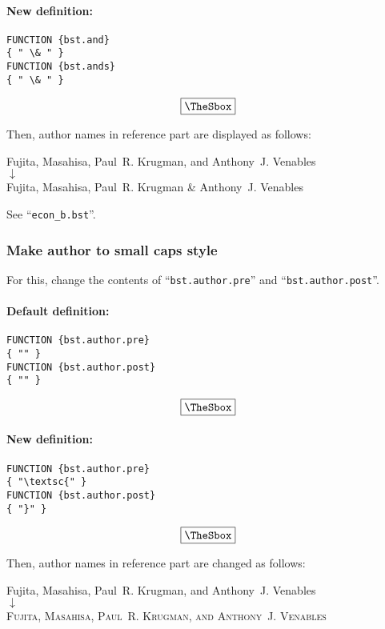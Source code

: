 \documentclass[10pt]{article}
\newenvironment{Frame}%
{\setlength{\fboxsep}{15pt}
\setlength{\mylength}{\linewidth}%
\addtolength{\mylength}{-2\fboxsep}%
\addtolength{\mylength}{-2\fboxrule}%
\Sbox
\minipage{\mylength}%
\setlength{\abovedisplayskip}{0pt}%
\setlength{\belowdisplayskip}{0pt}%
}%
{\endminipage\endSbox
\[\fbox{\TheSbox}\]}
\begin{document}
\paragraph{New definition:}
\begin{Frame}
\begin{verbatim}
FUNCTION {bst.and}
{ " \& " }
FUNCTION {bst.ands}
{ " \& " }
\end{verbatim}
\end{Frame}

Then, author names in reference part are displayed as follows:
\begin{center}
Fujita, Masahisa, Paul~R. Krugman, and Anthony~J. Venables \\
 $\downarrow$ \\
Fujita, Masahisa, Paul~R. Krugman \& Anthony~J. Venables 
\end{center}

See ``\verb|econ_b.bst|''.

\subsubsection{Make author to small caps style}

For this, change the contents of ``\texttt{bst.author.pre}'' and ``\texttt{bst.author.post}''.
\paragraph{Default definition:}
\begin{Frame}
\begin{verbatim}
FUNCTION {bst.author.pre}
{ "" }
FUNCTION {bst.author.post}
{ "" }
\end{verbatim}
\end{Frame}

\paragraph{New definition:}
\begin{Frame}
\begin{verbatim}
FUNCTION {bst.author.pre}
{ "\textsc{" }
FUNCTION {bst.author.post}
{ "}" }
\end{verbatim}
\end{Frame}

Then, author names in reference part are changed as follows:
\begin{center}
Fujita, Masahisa, Paul~R. Krugman, and Anthony~J. Venables \\
 $\downarrow$ \\
\textsc{Fujita, Masahisa, Paul~R. Krugman, and Anthony~J. Venables}
\end{center}
\end{document}
